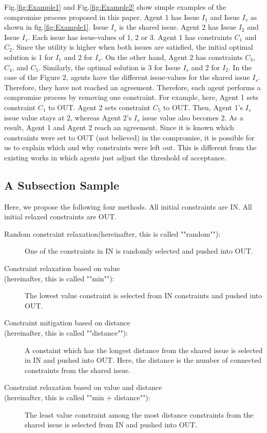 \documentclass[paper]{ieice}
\begin{document}
Fig.\ref{fig:Example1} and Fig.\ref{fig:Example2} show simple examples of the compromise process proposed in this paper. Agent 1 has Issue $I_1$ and Issue $I_s$ as shown in fig.\ref{fig:Example1}. Issue $I_s$ is the shared issue. Agent 2 has Issue $I_2$ and Issue $I_s$. Each issue has issue-values of 1, 2 or 3. Agent 1 has constraints $C_1$ and $C_2$. Since the utility is higher when both issues are satisfied, the initial optimal solution is 1 for $I_1$ and 2 for $I_s$. On the other hand, Agent 2 has constraints $C_3$, $C_4$, and $C_5$. Similarly, the optimal solution is 3 for Issue $I_s$ and 2 for $I_2$. In the case of the Figure 2, agents have the different issue-values for the shared issue $I_s$. Therefore, they have not reached an agreement. Therefore, each agent performs a compromise process by removing one constraint. For example, here, Agent 1 sets constraint $C_1$ to OUT. Agent 2 sets constraint $C_5$ to OUT. Then, Agent 1's $I_s$ issue value stays at 2, whereas Agent 2's $I_s$ issue value also becomes 2. As a result, Agent 1 and Agent 2 reach an agreement. Since it is known which constraints were set to OUT (not believed) in the compromise, it is possible for us to explain which and why constraints were left out. This is different from the existing works in which agents just adjust the threshold of acceptance.



\subsection{A Subsection Sample}

Here, we propose the following four methods. All initial constraints are IN. All initial relaxed constraints are OUT. 


\begin{description}
  \item[Random constraint relaxation\newline(hereinafter, this is called ""random""):] 


One of the constraints in IN is randomly selected and pushed into OUT. 
  \item[Constraint relaxation based on value\\(hereinafter, this is called ""min""):] 


  The lowest value constraint is selected from IN constraints and pushed into OUT. 
  \item[Constraint mitigation based on distance\\(hereinafter, this is called ""distance""):] 


  A constaint which has the longest distance from the shared issue is selected in IN and pushed into OUT. Here, the distance is the number of connected constraints from the shared issue. 
  \item[Constraint relaxation based on value and distance\\(hereinafter, this is called ""min + distance""):] 


  The least value constraint among the most distance constraints from the shared issue is selected from IN and pushed into OUT. 
\end{description}
\end{document}
